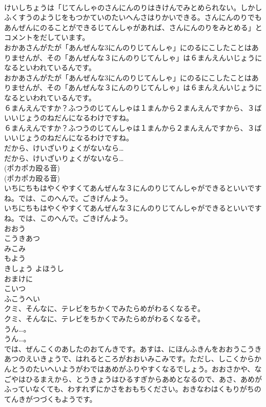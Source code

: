 \documentclass[8pt]{extreport}
\begin{document}
\begin{CJK}{UTF8}{min}
\\	けいしちょうは「じてんしゃのさんにんのりはきけんでみとめられない。しかしふくすうのようじをもつかていのたいへんさはりかいできる。さんにんのりでもあんぜんにのることができるじてんしゃがあれば、さんにんのりをみとめる」とコメントをだしています。
\\	おかあさんがたが「あんぜんな3にんのりじてんしゃ」にのるにこしたことはありませんが、その「あんぜんな３にんのりじてんしゃ」は６まんえんいじょうになるといわれているんです。
\\	おかあさんがたが「あんぜんな3にんのりじてんしゃ」にのるにこしたことはありませんが、その「あんぜんな３にんのりじてんしゃ」は６まんえんいじょうになるといわれているんです。
\\	６まんえんですか？ふつうのじてんしゃは１まんから２まんえんですから、３ばいいじょうのねだんになるわけですね。
\\	６まんえんですか？ふつうのじてんしゃは１まんから２まんえんですから、３ばいいじょうのねだんになるわけですね。
\\	だから、けいざいりょくがないなら…
\\	だから、けいざいりょくがないなら…
\\	(ポカポカ殴る音)
\\	(ポカポカ殴る音)
\\	いちにちもはやくやすくてあんぜんな３にんのりじてんしゃができるといいですね。では、このへんで。ごきげんよう。
\\	いちにちもはやくやすくてあんぜんな３にんのりじてんしゃができるといいですね。では、このへんで。ごきげんよう。
\\	おおう
\\	こうきあつ
\\	みこみ
\\	もよう
\\	きしょう よほうし
\\	おまけに
\\	こいつ
\\	ふこうへい
\\	クミ、そんなに、テレビをちかくでみたらめがわるくなるぞ。
\\	クミ、そんなに、テレビをちかくでみたらめがわるくなるぞ。
\\	うん…。
\\	うん…。
\\	では、ぜんこくのあしたのおてんきです。あすは、にほんふきんをおおうこうきあつのえいきょうで、はれるところがおおいみこみです。ただし、しこくからかんとうのたいへいようがわではあめがふりやすくなるでしょう。おおさかや、なごやはひるまえから、とうきょうはひるすぎからあめとなるので、あさ、あめがふっていなくても、わすれずにかさをおもちください。おきなわはくもりがちのてんきがつづくもようです。

\end{CJK}
\end{document}
